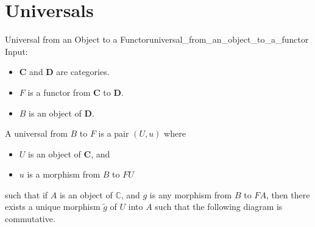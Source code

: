 \documentclass{article}
\begin{document}
\section{Universals}

\begin{definition}{Universal from an Object to a Functor}{universal_from_an_object_to_a_functor}
    Input:
    \begin{itemize}
        \item $\mathbf{C}$ and $\mathbf{D}$ are categories.
        \item $F$ is a functor from $\mathbf{C}$ to $\mathbf{D}$.
        \item $B$ is an object of $\mathbf{D}$.
    \end{itemize}
    A universal from $B$ to $F$ is a pair $(U,u)$ where
    \begin{itemize}
        \item $U$ is an object of $\mathbf{C}$, and
        \item $u$ is a morphism from $B$ to $FU$
    \end{itemize}
    such that if $A$ is an object of $\mathbb{C}$,
    and $g$ is any morphism from $B$ to $FA$,
    then there exists a unique morphism $\tilde{g}$ of $U$ into $A$
    such that the following diagram is commutative.
    \begin{center}
    \end{center}
\end{definition}
\end{document}
